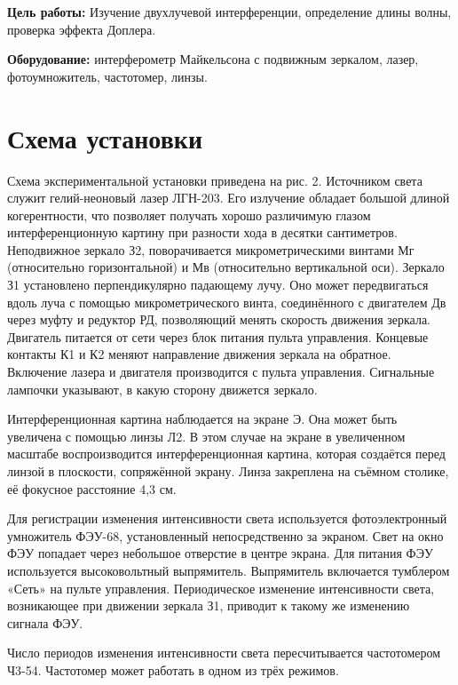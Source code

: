 






\textbf{Цель работы:} Изучение двухлучевой интерференции, определение длины волны, проверка эффекта Доплера.

\textbf{Оборудование:} интерферометр Майкельсона с подвижным зеркалом, лазер, фотоумножитель, частотомер, линзы.



\section{Схема установки}

Схема экспериментальной установки приведена на рис. 2. Источником света служит гелий-неоновый лазер
ЛГН-203. Его излучение обладает большой длиной когерентности, что
позволяет получать хорошо различимую глазом интерференционную
картину при разности хода в десятки сантиметров. Неподвижное зеркало З2, поворачивается микрометрическими винтами Мг (относительно горизонтальной) и Мв (относительно вертикальной оси). Зеркало З1
установлено перпендикулярно падающему лучу. Оно может передвигаться вдоль луча с помощью микрометрического винта, соединённого
с двигателем Дв через муфту и редуктор РД, позволяющий менять
скорость движения зеркала. Двигатель питается от сети через блок питания пульта управления. Концевые контакты К1 и К2 меняют направление движения зеркала на обратное. Включение лазера и двигателя
производится с пульта управления. Сигнальные лампочки указывают,
в какую сторону движется зеркало.

Интерференционная картина наблюдается на экране Э. Она может
быть увеличена с помощью линзы Л2. В этом случае на экране в увеличенном масштабе воспроизводится интерференционная картина, которая создаётся перед линзой в плоскости, сопряжённой экрану. Линза
закреплена на съёмном столике, её фокусное расстояние 4,3 см.


Для регистрации изменения интенсивности света используется фотоэлектронный умножитель ФЭУ-68, установленный непосредственно
за экраном. Свет на окно ФЭУ попадает через небольшое отверстие в
центре экрана. Для питания ФЭУ используется высоковольтный выпрямитель. Выпрямитель включается тумблером «Сеть» на пульте управления.
Периодическое изменение интенсивности света, возникающее при
движении зеркала З1, приводит к такому же изменению сигнала ФЭУ.

Число периодов изменения интенсивности света пересчитывается частотомером Ч3-54. Частотомер может работать в одном из трёх режимов.

